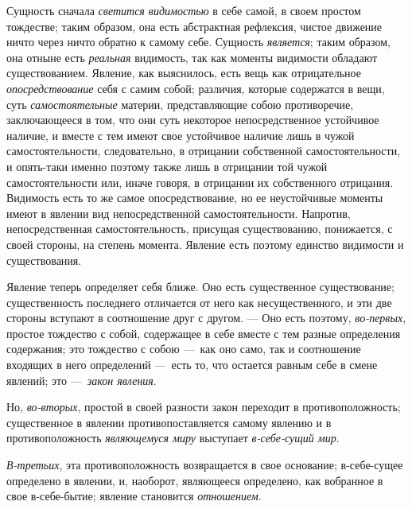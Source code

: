 Сущность сначала {\em светится видимостью} в себе самой,
в своем простом тождестве; таким образом, она есть абстрактная рефлексия,
чистое движение ничто через ничто обратно к самому себе. Сущность
{\em является}; таким образом, она отныне есть
{\em реальная} видимость, так как моменты видимости
обладают существованием. Явление, как выяснилось, есть вещь как
отрицательное {\em опосредствование} себя с самим
собой; различия, которые содержатся в вещи, суть
{\em самостоятельные} материи, представляющие собою
противоречие, заключающееся в том, что они суть некоторое непосредственное
устойчивое наличие, и вместе с тем имеют свое устойчивое наличие лишь в
чужой самостоятельности, следовательно, в отрицании собственной
самостоятельности, и опять-таки именно поэтому также лишь в отрицании той
чужой самостоятельности или, иначе говоря, в отрицании их собственного
отрицания. Видимость есть то же самое опосредствование, но ее неустойчивые
моменты имеют в явлении вид непосредственной самостоятельности. Напротив,
непосредственная самостоятельность, присущая существованию, понижается, с
своей стороны, на степень момента. Явление есть поэтому единство видимости
и существования.

Явление теперь определяет себя ближе. Оно есть существенное существование;
существенность последнего отличается от него как несущественного, и эти две
стороны вступают в соотношение друг с другом. — Оно есть поэтому,
{\em во-первых}, простое тождество с собой, содержащее
в себе вместе с тем разные определения содержания; это тождество с собою
—~как оно само, так и соотношение входящих в него определений —~есть то,
что остается равным себе в смене явлений; это
—~{\em закон явления}.

Но, {\em во-вторых}, простой в своей разности закон
переходит в противоположность; существенное в явлении противопоставляется
самому явлению и в противоположность {\em являющемуся
миру} выступает {\em в-себе-сущий мир}.

{\em В-третьих}, эта противоположность возвращается в
свое основание; в-себе-сущее определено в явлении, и, наоборот, являющееся
определено, как вобранное в свое в-себе-бытие; явление становится
{\em отношением}.


